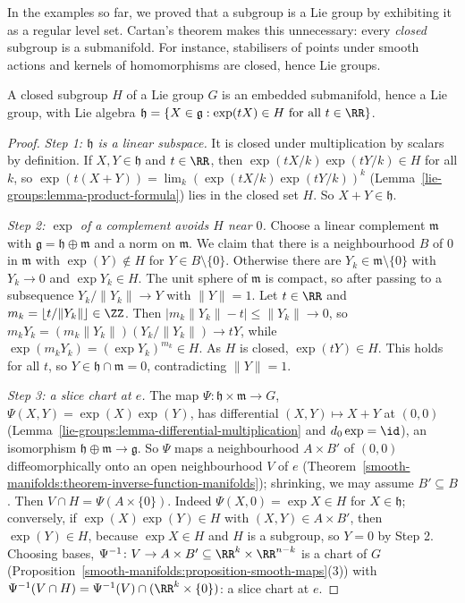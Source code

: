 In the examples so far, we proved that a subgroup is a Lie group by exhibiting it as a regular level set. Cartan's theorem makes this unnecessary: every
\emph{closed} subgroup is a submanifold. For instance, stabilisers of points under smooth actions and kernels of homomorphisms are closed, hence Lie groups.

\begin{theorem}[Cartan]\label{lie-groups:theorem-closed-subgroup}
A closed subgroup $H$ of a Lie group $G$ is an embedded submanifold, hence a Lie group, with Lie algebra
$\mathfrak{h} = \{X \in \mathfrak{g} : \exp(tX) \in H \text{ for all } t \in \RR\}$.
\end{theorem}

\begin{proof}
\emph{Step 1: $\mathfrak{h}$ is a linear subspace.} It is closed under multiplication by scalars by definition. If $X, Y \in \mathfrak{h}$ and $t \in \RR$, then
$\exp(tX/k)\exp(tY/k) \in H$ for all $k$, so $\exp(t(X + Y)) = \lim_k(\exp(tX/k)\exp(tY/k))^k$ (Lemma~\ref{lie-groups:lemma-product-formula}) lies in the closed
set $H$. So $X + Y \in \mathfrak{h}$.

\emph{Step 2: $\exp$ of a complement avoids $H$ near $0$.} Choose a linear complement $\mathfrak{m}$ with $\mathfrak{g} = \mathfrak{h} \oplus \mathfrak{m}$
and a norm on $\mathfrak{m}$. We claim that there is a neighbourhood $B$ of $0$ in $\mathfrak{m}$ with $\exp(Y) \notin H$ for $Y \in B \setminus \{0\}$.
Otherwise there are $Y_k \in \mathfrak{m} \setminus \{0\}$ with $Y_k \to 0$ and $\exp Y_k \in H$. The unit sphere of $\mathfrak{m}$ is compact, so after
passing to a subsequence $Y_k/\|Y_k\| \to Y$ with $\|Y\| = 1$. Let $t \in \RR$ and $m_k = \lfloor t/\|Y_k\|\rfloor \in \ZZ$. Then
$|m_k\|Y_k\| - t| \leq \|Y_k\| \to 0$, so $m_kY_k = (m_k\|Y_k\|)(Y_k/\|Y_k\|) \to tY$, while $\exp(m_kY_k) = (\exp Y_k)^{m_k} \in H$. As $H$ is closed,
$\exp(tY) \in H$. This holds for all $t$, so $Y \in \mathfrak{h} \cap \mathfrak{m} = 0$, contradicting $\|Y\| = 1$.

\emph{Step 3: a slice chart at $e$.} The map $\Psi \colon \mathfrak{h} \times \mathfrak{m} \to G$, $\Psi(X, Y) = \exp(X)\exp(Y)$, has differential
$(X, Y) \mapsto X + Y$ at $(0, 0)$ (Lemma~\ref{lie-groups:lemma-differential-multiplication} and $d_0\exp = \id$), an isomorphism
$\mathfrak{h} \oplus \mathfrak{m} \to \mathfrak{g}$. So $\Psi$ maps a neighbourhood $A \times B'$ of $(0, 0)$ diffeomorphically onto an open neighbourhood $V$
of $e$ (Theorem~\ref{smooth-manifolds:theorem-inverse-function-manifolds}); shrinking, we may assume $B' \subseteq B$. Then $V \cap H = \Psi(A \times \{0\})$.
Indeed $\Psi(X, 0) = \exp X \in H$ for $X \in \mathfrak{h}$; conversely, if $\exp(X)\exp(Y) \in H$ with $(X, Y) \in A \times B'$, then $\exp(Y) \in H$, because
$\exp X \in H$ and $H$ is a subgroup, so $Y = 0$ by Step 2. Choosing bases, $\Psi^{-1} \colon V \to A \times B' \subseteq \RR^k \times \RR^{n-k}$ is a chart of
$G$ (Proposition~\ref{smooth-manifolds:proposition-smooth-maps}(3)) with $\Psi^{-1}(V \cap H) = \Psi^{-1}(V) \cap (\RR^k \times \{0\})$: a slice chart at $e$.


\end{proof}
